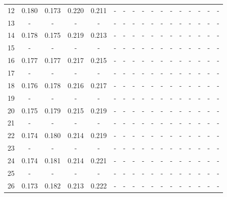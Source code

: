 \documentclass{report}
\begin{document}
\begin{appendices}
\begin{table}
\begin{tabular}{|c|cccc|cccc|cccc|cccc|}
12 & 0.180 & 0.173 & 0.220 & 0.211 &   -   &   -   &   -   &   -   &   -   &   -   &   -   &   -   &   -   &   -   &   -   &   -   \\
13 &   -   &   -   &   -   &   -   &   -   &   -   &   -   &   -   &   -   &   -   &   -   &   -   &   -   &   -   &   -   &   -   \\
14 & 0.178 & 0.175 & 0.219 & 0.213 &   -   &   -   &   -   &   -   &   -   &   -   &   -   &   -   &   -   &   -   &   -   &   -   \\
15 &   -   &   -   &   -   &   -   &   -   &   -   &   -   &   -   &   -   &   -   &   -   &   -   &   -   &   -   &   -   &   -   \\
16 & 0.177 & 0.177 & 0.217 & 0.215 &   -   &   -   &   -   &   -   &   -   &   -   &   -   &   -   &   -   &   -   &   -   &   -   \\
17 &   -   &   -   &   -   &   -   &   -   &   -   &   -   &   -   &   -   &   -   &   -   &   -   &   -   &   -   &   -   &   -   \\
18 & 0.176 & 0.178 & 0.216 & 0.217 &   -   &   -   &   -   &   -   &   -   &   -   &   -   &   -   &   -   &   -   &   -   &   -   \\
19 &   -   &   -   &   -   &   -   &   -   &   -   &   -   &   -   &   -   &   -   &   -   &   -   &   -   &   -   &   -   &   -   \\
20 & 0.175 & 0.179 & 0.215 & 0.219 &   -   &   -   &   -   &   -   &   -   &   -   &   -   &   -   &   -   &   -   &   -   &   -   \\
21 &   -   &   -   &   -   &   -   &   -   &   -   &   -   &   -   &   -   &   -   &   -   &   -   &   -   &   -   &   -   &   -   \\
22 & 0.174 & 0.180 & 0.214 & 0.219 &   -   &   -   &   -   &   -   &   -   &   -   &   -   &   -   &   -   &   -   &   -   &   -   \\
23 &   -   &   -   &   -   &   -   &   -   &   -   &   -   &   -   &   -   &   -   &   -   &   -   &   -   &   -   &   -   &   -   \\
24 & 0.174 & 0.181 & 0.214 & 0.221 &   -   &   -   &   -   &   -   &   -   &   -   &   -   &   -   &   -   &   -   &   -   &   -   \\
25 &   -   &   -   &   -   &   -   &   -   &   -   &   -   &   -   &   -   &   -   &   -   &   -   &   -   &   -   &   -   &   -   \\
26 & 0.173 & 0.182 & 0.213 & 0.222 &   -   &   -   &   -   &   -   &   -   &   -   &   -   &   -   &   -   &   -   &   -   &   -   \\

\end{tabular}
\end{table}
\end{appendices}
\end{document}
